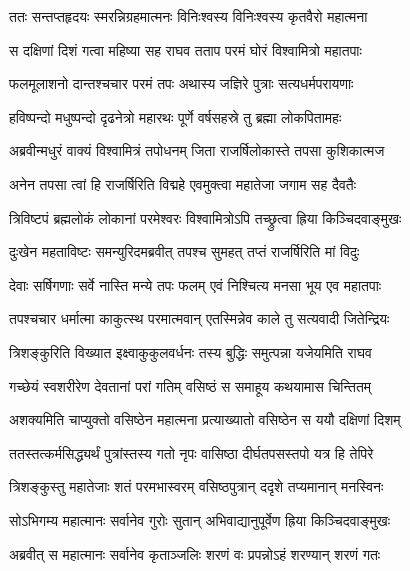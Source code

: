 
\twolineshloka
{ततः सन्तप्तहृदयः स्मरन्निग्रहमात्मनः}
{विनिःश्वस्य विनिःश्वस्य कृतवैरो महात्मना} %

\twolineshloka
{स दक्षिणां दिशं गत्वा महिष्या सह राघव}
{तताप परमं घोरं विश्वामित्रो महातपाः} %

\twolineshloka
{फलमूलाशनो दान्तश्चचार परमं तपः}
{अथास्य जज्ञिरे पुत्राः सत्यधर्मपरायणाः} %

\twolineshloka
{हविष्पन्दो मधुष्पन्दो दृढनेत्रो महारथः}
{पूर्णे वर्षसहस्रे तु ब्रह्मा लोकपितामहः} %

\twolineshloka
{अब्रवीन्मधुरं वाक्यं विश्वामित्रं तपोधनम्}
{जिता राजर्षिलोकास्ते तपसा कुशिकात्मज} %

\twolineshloka
{अनेन तपसा त्वां हि राजर्षिरिति विद्महे}
{एवमुक्त्वा महातेजा जगाम सह दैवतैः} %

\twolineshloka
{त्रिविष्टपं ब्रह्मलोकं लोकानां परमेश्वरः}
{विश्वामित्रोऽपि तच्छ्रुत्वा ह्रिया किञ्चिदवाङ्मुखः} %

\twolineshloka
{दुःखेन महताविष्टः समन्युरिदमब्रवीत्}
{तपश्च सुमहत् तप्तं राजर्षिरिति मां विदुः} %

\twolineshloka
{देवाः सर्षिगणाः सर्वे नास्ति मन्ये तपः फलम्}
{एवं निश्चित्य मनसा भूय एव महातपाः} %

\twolineshloka
{तपश्चचार धर्मात्मा काकुत्स्थ परमात्मवान्}
{एतस्मिन्नेव काले तु सत्यवादी जितेन्द्रियः} %

\twolineshloka
{त्रिशङ्कुरिति विख्यात इक्ष्वाकुकुलवर्धनः}
{तस्य बुद्धिः समुत्पन्ना यजेयमिति राघव} %

\twolineshloka
{गच्छेयं स्वशरीरेण देवतानां परां गतिम्}
{वसिष्ठं स समाहूय कथयामास चिन्तितम्} %

\twolineshloka
{अशक्यमिति चाप्युक्तो वसिष्ठेन महात्मना}
{प्रत्याख्यातो वसिष्ठेन स ययौ दक्षिणां दिशम्} %

\twolineshloka
{ततस्तत्कर्मसिद्ध्यर्थं पुत्रांस्तस्य गतो नृपः}
{वासिष्ठा दीर्घतपसस्तपो यत्र हि तेपिरे} %

\twolineshloka
{त्रिशङ्कुस्तु महातेजाः शतं परमभास्वरम्}
{वसिष्ठपुत्रान् ददृशे तप्यमानान् मनस्विनः} %

\twolineshloka
{सोऽभिगम्य महात्मानः सर्वानेव गुरोः सुतान्}
{अभिवाद्यानुपूर्वेण ह्रिया किञ्चिदवाङ्मुखः} %

\twolineshloka
{अब्रवीत् स महात्मानः सर्वानेव कृताञ्जलिः}
{शरणं वः प्रपन्नोऽहं शरण्यान् शरणं गतः} %

